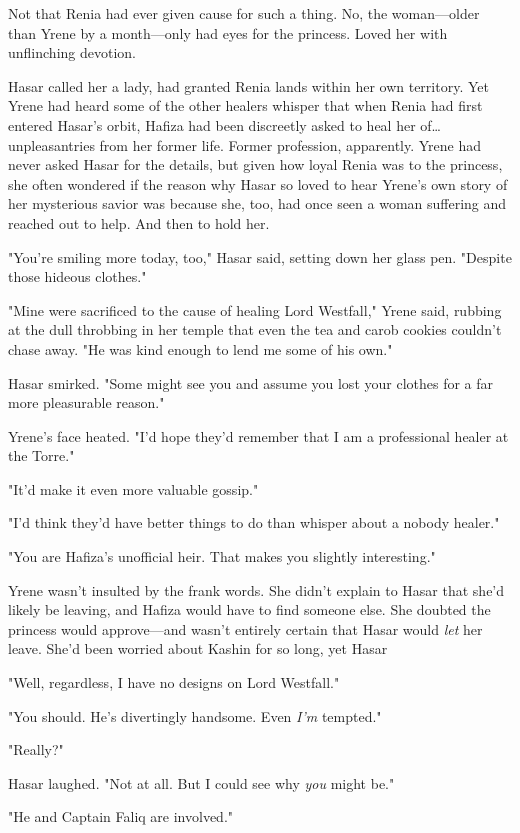 Not that Renia had ever given cause for such a thing.
No, the woman---older than Yrene by a month---only had eyes for the princess.
Loved her with unflinching devotion.

Hasar called her a lady, had granted Renia lands within her own territory.
Yet Yrene had heard some of the other healers whisper that when Renia had first entered Hasar's orbit, Hafiza had been discreetly asked to heal her of\ldots unpleasantries from her former life.
Former profession, apparently.
Yrene had never asked Hasar for the details, but given how loyal Renia was to the princess, she often wondered if the reason why Hasar so loved to hear Yrene's own story of her mysterious savior was because she, too, had once seen a woman suffering and reached out to help.
And then to hold her.

"You're smiling more today, too," Hasar said, setting down her glass pen.
"Despite those hideous clothes."

"Mine were sacrificed to the cause of healing Lord Westfall," Yrene said, rubbing at the dull throbbing in her temple that even the tea and carob cookies couldn't chase away.
"He was kind enough to lend me some of his own."

Hasar smirked.
"Some might see you and assume you lost your clothes for a far more pleasurable reason."

Yrene's face heated.
"I'd hope they'd remember that I am a professional healer at the Torre."

"It'd make it even more valuable gossip."

"I'd think they'd have better things to do than whisper about a nobody healer."

"You are Hafiza's unofficial heir.
That makes you slightly interesting."

Yrene wasn't insulted by the frank words.
She didn't explain to Hasar that she'd likely be leaving, and Hafiza would have to find someone else.
She doubted the princess would approve---and wasn't entirely certain that Hasar would \emph{let} her leave.
She'd been worried about Kashin for so long, yet Hasar 

"Well, regardless, I have no designs on Lord Westfall."

"You should.
He's divertingly handsome.
Even \emph{I'm} tempted."

"Really?"

Hasar laughed.
"Not at all.
But I could see why \emph{you} might be."

"He and Captain Faliq are involved."

